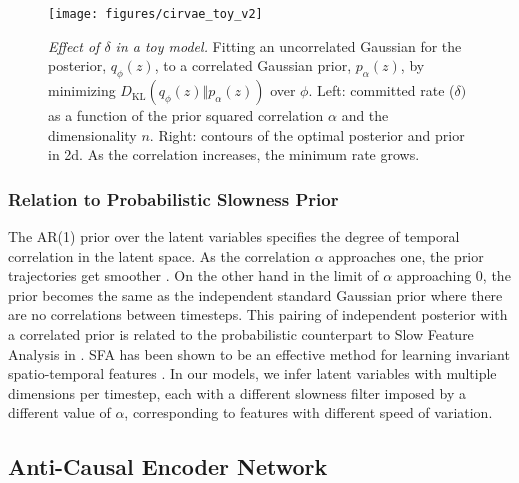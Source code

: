 \documentclass{article} \usepackage{iclr2019_conference,times}
\newcommand{\KL}{D_{\mathrm{KL}}}
\begin{document}
\begin{figure}[h]
    \centering
    \texttt{[image: figures/cirvae\_toy\_v2]}
    \vspace{-3mm}
\caption{{\em Effect of $\delta$ in a toy model.} Fitting an uncorrelated Gaussian for the posterior, $q_\phi(z)$, to a correlated Gaussian prior, $p_\alpha(z)$, by minimizing $\KL(q_\phi(z) \Vert p_\alpha(z))$ over $\phi$. Left: committed rate ($\delta)$ as a function of the prior squared correlation $\alpha$ and the  dimensionality $n$. Right: contours of the optimal posterior and prior in 2d. As the correlation increases, the minimum rate grows.} 
    \label{fig:toy}

\end{figure}

\subsubsection{Relation to Probabilistic Slowness Prior}
The AR(1) prior over the latent variables specifies the degree of temporal correlation in the latent space. As the correlation $\alpha$ approaches one, the prior trajectories get smoother . On the other hand in the limit of $\alpha$ approaching $0$, the prior becomes the same as the independent standard Gaussian prior where there are no correlations between timesteps. This pairing of independent posterior with a correlated prior is related to the probabilistic counterpart to Slow Feature Analysis \citep{SFA} in \citet{TurnerSahani}. 
SFA has been shown to be an effective method for learning invariant spatio-temporal features \citep{SFA}. In our models, we infer latent variables with multiple dimensions per timestep, each with a different slowness filter imposed by a different value of $\alpha$, corresponding to features with different speed of variation. 


\subsection{Anti-Causal Encoder Network}\label{sec:anticausal}
\end{document}
